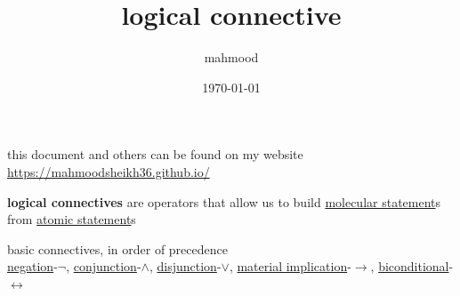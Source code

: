 \documentclass[a4paper,12pt]{article}
\author{mahmood}
\date{\today}
\title{logical connective}
\begin{document}
\maketitle
\begin{note}
this document and others can be found on my website\\
\url{https://mahmoodsheikh36.github.io/}
\end{note}
\begin{definition}
\textbf{logical connectives} are operators that allow us to build \href{20230401175827-molecular_statement.org}{molecular statement}s from \href{20230401175521-atomic_statement.org}{atomic statement}s\\
\end{definition}
basic connectives, in order of precedence\\
\href{20230422184813-negation.org}{negation}-\(\lnot\), \href{20230422184822-conjunction.org}{conjunction}-\(\land\), \href{20230422184826-disjunction.org}{disjunction}-\(\lor\), \href{20230422184005-material_implication.org}{material implication}-\(\rightarrow\), \href{20230422184017-biconditional.org}{biconditional}-\(\leftrightarrow\)
\end{document}
